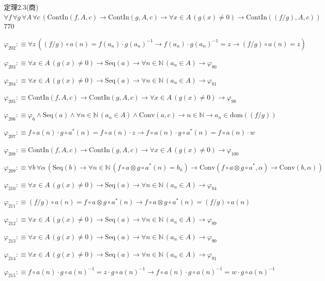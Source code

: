 \begin{fullproof}{定理2.3(商)}{$\forall f\,\forall g\,\forall A\,\forall c\,(\mathrm{ContIn}(f,A,c) \to \mathrm{ContIn}(g,A,c) \to \forall x \in A\,(g(x) \neq 0) \to \mathrm{ContIn}((f / g),A,c))$}{770}
\begin{abbrevlist}
\item $\varphi_{202} :\equiv \forall z\,((f / g) \circ a(n) = f(a_{n}) \cdot g(a_{n})^{-1} \to f(a_{n}) \cdot g(a_{n})^{-1} = z \to (f / g) \circ a(n) = z)$
\item $\varphi_{203} :\equiv \forall x \in A\,(g(x) \neq 0) \to \mathrm{Seq}(a) \to \forall n \in \mathbb{N}\,(a_{n} \in A) \to \varphi_{80}$
\item $\varphi_{204} :\equiv \forall x \in A\,(g(x) \neq 0) \to \mathrm{Seq}(a) \to \forall n \in \mathbb{N}\,(a_{n} \in A) \to \varphi_{81}$
\item $\varphi_{205} :\equiv \mathrm{ContIn}(f,A,c) \to \mathrm{ContIn}(g,A,c) \to \forall x \in A\,(g(x) \neq 0) \to \varphi_{98}$
\item $\varphi_{206} :\equiv \varphi_{6} \land \mathrm{Seq}(a) \land \forall n \in \mathbb{N}\,(a_{n} \in A) \land \mathrm{Conv}(a,c) \to n \in \mathbb{N} \to a_{n} \in \mathrm{dom}((f / g))$
\item $\varphi_{207} :\equiv f \circ a(n) \cdot g \circ a^{\ast}(n) = f \circ a(n) \cdot z \to f \circ a(n) \cdot g \circ a^{\ast}(n) = f \circ a(n) \cdot w$
\item $\varphi_{208} :\equiv \mathrm{ContIn}(f,A,c) \to \mathrm{ContIn}(g,A,c) \to \forall x \in A\,(g(x) \neq 0) \to \varphi_{100}$
\item $\varphi_{209} :\equiv \forall b\,\forall \alpha\,(\mathrm{Seq}(b) \to \forall n \in \mathbb{N}\,(f \circ a \otimes g \circ a^{\ast}(n) = b_{n}) \to \mathrm{Conv}(f \circ a \otimes g \circ a^{\ast},\alpha) \to \mathrm{Conv}(b,\alpha))$
\item $\varphi_{210} :\equiv \forall x \in A\,(g(x) \neq 0) \to \mathrm{Seq}(a) \to \forall n \in \mathbb{N}\,(a_{n} \in A) \to \varphi_{84}$
\item $\varphi_{211} :\equiv (f / g) \circ a(n) = f \circ a \otimes g \circ a^{\ast}(n) \to f \circ a \otimes g \circ a^{\ast}(n) = (f / g) \circ a(n)$
\item $\varphi_{212} :\equiv \forall x \in A\,(g(x) \neq 0) \to \mathrm{Seq}(a) \to \forall n \in \mathbb{N}\,(a_{n} \in A) \to \varphi_{89}$
\item $\varphi_{213} :\equiv \forall x \in A\,(g(x) \neq 0) \to \mathrm{Seq}(a) \to \forall n \in \mathbb{N}\,(a_{n} \in A) \to \varphi_{90}$
\item $\varphi_{214} :\equiv \forall x \in A\,(g(x) \neq 0) \to \mathrm{Seq}(a) \to \forall n \in \mathbb{N}\,(a_{n} \in A) \to \varphi_{91}$
\item $\varphi_{215} :\equiv f \circ a(n) \cdot g \circ a(n)^{-1} = z \cdot g \circ a(n)^{-1} \to f \circ a(n) \cdot g \circ a(n)^{-1} = w \cdot g \circ a(n)^{-1}$

\end{abbrevlist}
\end{fullproof}
